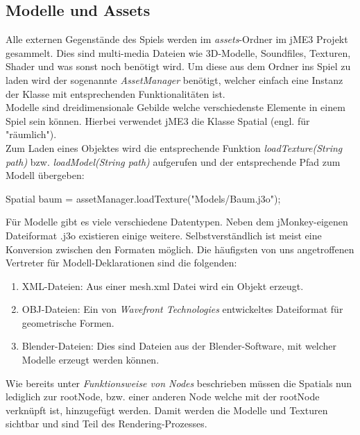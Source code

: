 \subsection{Modelle und Assets}
Alle externen Gegenstände des Spiels werden im \emph{assets}-Ordner im jME3 Projekt gesammelt. Dies sind multi-media Dateien wie 3D-Modelle, Soundfiles, Texturen, Shader und was sonst noch benötigt wird.
Um diese aus dem Ordner ins Spiel zu laden wird der sogenannte \emph{AssetManager} benötigt, welcher einfach eine Instanz der Klasse mit entsprechenden Funktionalitäten ist. \\Modelle sind dreidimensionale Gebilde welche verschiedenste Elemente in einem Spiel sein können. Hierbei verwendet jME3 die Klasse Spatial (engl. für "räumlich"). \\Zum Laden eines Objektes wird die entsprechende Funktion \emph{loadTexture(String path)} bzw. \emph{loadModel(String path)} aufgerufen und der entsprechende Pfad zum Modell übergeben:
\begin{center}
{Spatial baum = assetManager.loadTexture("Models/Baum.j3o");}
\end{center} Für Modelle gibt es viele verschiedene Datentypen. Neben dem jMonkey-eigenen Dateiformat .j3o existieren einige weitere. Selbstverständlich ist meist eine Konversion zwischen den Formaten möglich. Die häufigsten von uns angetroffenen Vertreter für Modell-Deklarationen sind die folgenden:
\begin{enumerate}
	\item XML-Dateien: Aus einer mesh.xml Datei wird ein Objekt erzeugt. 
	\item OBJ-Dateien: Ein von \emph{Wavefront Technologies} entwickeltes Dateiformat für geometrische Formen. \cite{OBJ1}
	\item Blender-Dateien: Dies sind Dateien aus der Blender-Software, mit welcher Modelle erzeugt werden können.
\end{enumerate} Wie bereits unter \emph{Funktionsweise von Nodes} beschrieben müssen die Spatials nun lediglich zur rootNode, bzw. einer anderen Node welche mit der rootNode verknüpft ist, hinzugefügt werden. Damit werden die Modelle und Texturen sichtbar und sind Teil des Rendering-Prozesses.


